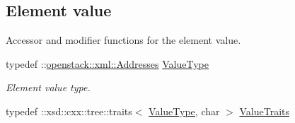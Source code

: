 \subsection*{Element value}
\label{_amgrp2ee2eae1a8c390ea033f241c027da8d6}
Accessor and modifier functions for the element value. \begin{DoxyCompactItemize}
\item 
\hypertarget{classopenstack_1_1xml_1_1Addresses___af3bdd18f61710691295c2fa15a751d24}{
typedef ::\hyperlink{classopenstack_1_1xml_1_1Addresses}{openstack::xml::Addresses} \hyperlink{classopenstack_1_1xml_1_1Addresses___af3bdd18f61710691295c2fa15a751d24}{ValueType}}
\label{classopenstack_1_1xml_1_1Addresses___af3bdd18f61710691295c2fa15a751d24}

\begin{DoxyCompactList}\small\item\em Element value type. \item\end{DoxyCompactList}\item 
\hypertarget{classopenstack_1_1xml_1_1Addresses___a3a25dd833a0dbe6c97cd73b921993404}{
typedef ::xsd::cxx::tree::traits$<$ \hyperlink{classopenstack_1_1xml_1_1Addresses}{ValueType}, char $>$ \hyperlink{classopenstack_1_1xml_1_1Addresses___a3a25dd833a0dbe6c97cd73b921993404}{ValueTraits}}
\label{classopenstack_1_1xml_1_1Addresses___a3a25dd833a0dbe6c97cd73b921993404}


\end{DoxyCompactItemize}
